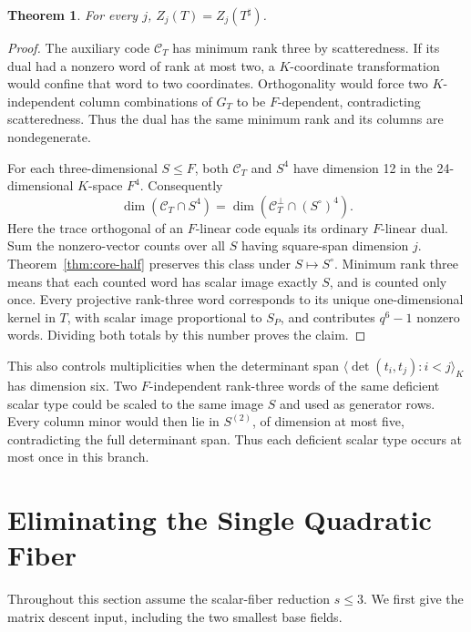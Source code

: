 \documentclass[12pt,letterpaper,onecolumn]{article}
\newtheorem{theorem}{Theorem}
\theoremstyle{definition}
\theoremstyle{remark}
\begin{document}
\begin{theorem}\label{thm:core-duality}
For every \(j\), \(Z_j(T)=Z_j(T^\sharp)\).
\end{theorem}
\begin{proof}
The auxiliary code \(\mathcal C_T\) has minimum rank three by scatteredness.
If its dual had a nonzero word of rank at most two, a \(K\)-coordinate transformation would confine that word to two coordinates. Orthogonality would force two \(K\)-independent column combinations of \(G_T\) to be \(F\)-dependent, contradicting scatteredness. Thus the dual has the same minimum rank and its columns are nondegenerate.

For each three-dimensional \(S\le F\), both \(\mathcal C_T\) and \(S^4\) have dimension 12 in the 24-dimensional \(K\)-space \(F^4\). Consequently
\[
\dim(\mathcal C_T\cap S^4)
=\dim(\mathcal C_T^\perp\cap(S^\circ)^4).
\]
Here the trace orthogonal of an \(F\)-linear code equals its ordinary \(F\)-linear dual. Sum the nonzero-vector counts over all \(S\) having square-span dimension \(j\). Theorem~\ref{thm:core-half} preserves this class under \(S\mapsto S^\circ\).
Minimum rank three means that each counted word has scalar image exactly \(S\), and is counted only once.
Every projective rank-three word corresponds to its unique one-dimensional kernel in \(T\), with scalar image proportional to \(S_P\), and contributes \(q^6-1\) nonzero words. Dividing both totals by this number proves the claim.
\end{proof}

This also controls multiplicities when the determinant span
\(\langle\det(t_i,t_j):i<j\rangle_K\) has dimension six. Two \(F\)-independent rank-three words of the same deficient scalar type could be scaled to the same image \(S\) and used as generator rows. Every column minor would then lie in \(S^{(2)}\), of dimension at most five, contradicting the full determinant span. Thus each deficient scalar type occurs at most once in this branch.

\section{Eliminating the Single Quadratic Fiber}
Throughout this section assume the scalar-fiber reduction \(s\le3\).
We first give the matrix descent input, including the two smallest base fields.
\end{document}
